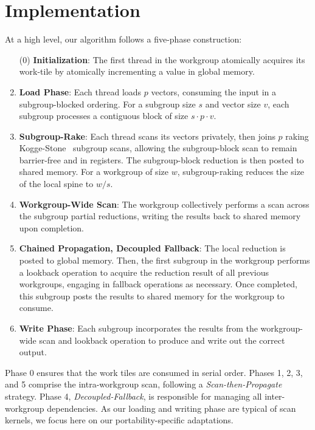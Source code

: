 \documentclass[sigconf]{acmart}
\begin{document}
\section{Implementation}
At a high level, our algorithm follows a five-phase construction:
\begin{enumerate}
  \item[(0)] \textbf {Initialization}: The first thread in the workgroup atomically acquires its work-tile by atomically incrementing a value in global memory.
  \item \textbf{Load Phase}: Each thread loads $p$ vectors, consuming the input in a subgroup-blocked ordering. For a subgroup size $s$ and vector size $v$, each subgroup processes a contiguous block of size $s \cdot p \cdot v$.
  \item \textbf{Subgroup-Rake}: Each thread scans its vectors privately, then joins $p$ raking Kogge-Stone~\cite{5009159} subgroup scans,
        allowing the subgroup-block scan to remain barrier-free and in registers. The subgroup-block reduction is then posted to shared memory. For a workgroup of size $w$, subgroup-raking reduces the size of the local spine to $w/s$.
  \item \textbf{Workgroup-Wide Scan}: The workgroup collectively performs a scan across the subgroup partial reductions, writing the results back to shared memory upon completion.
  \item \textbf{Chained Propagation, Decoupled Fallback}: The local reduction is posted to global memory. Then, the first subgroup in the workgroup performs a lookback operation to acquire the reduction result of all previous workgroups, engaging in fallback operations as necessary. Once completed, this subgroup posts the results to shared memory for the workgroup to consume.
  \item \textbf{Write Phase}: Each subgroup incorporates the results from the workgroup-wide scan and lookback operation to produce and write out the correct output.
\end{enumerate}
Phase 0 ensures that the work tiles are consumed in serial order. Phases 1, 2, 3, and 5 comprise the intra-workgroup scan, following a \emph{Scan-then-Propagate} strategy. Phase 4, \emph{Decoupled-Fallback}, is responsible for managing all inter-workgroup dependencies. As our loading and writing phase are typical of scan kernels, we focus here on our portability-specific adaptations.
\end{document}

